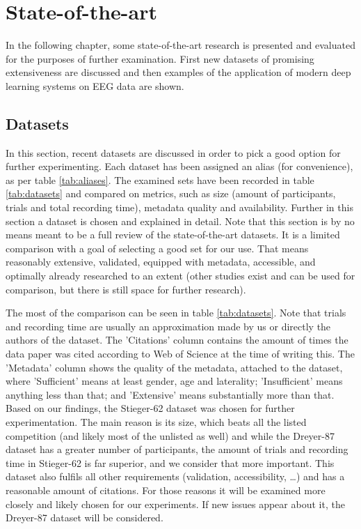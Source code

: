 \documentclass[english, he, bc, kiv, iso690alph, viewonly]{fasthesis}
\begin{document}
\chapter{State-of-the-art}

In the following chapter, some state-of-the-art research is presented and evaluated for the purposes of further examination. First new datasets of promising extensiveness are discussed and then examples of the application of modern deep learning systems on EEG data are shown.

\section{Datasets}

In this section, recent datasets are discussed in order to pick a good option for further experimenting. Each dataset has been assigned an alias (for convenience), as per table \ref{tab:aliases}. The examined sets have been recorded in table \ref{tab:datasets} and compared on metrics, such as size (amount of participants, trials and total recording time), metadata quality and availability. Further in this section a dataset is chosen and explained in detail. Note that this section is by no means meant to be a full review of the state-of-the-art datasets. It is a limited comparison with a goal of selecting a good set for our use. That means reasonably extensive, validated, equipped with metadata, accessible, and optimally already researched to an extent (other studies exist and can be used for comparison, but there is still space for further research).

The most of the comparison can be seen in table \ref{tab:datasets}. Note that trials and recording time are usually an approximation made by us or directly the authors of the dataset. The 'Citations' column contains the amount of times the data paper was cited according to Web of Science at the time of writing this. The 'Metadata' column shows the quality of the metadata, attached to the dataset, where 'Sufficient' means at least gender, age and laterality; 'Insufficient' means anything less than that; and 'Extensive' means substantially more than that.
Based on our findings, the Stieger-62 dataset was chosen for further experimentation. The main reason is its size, which beats all the listed competition (and likely most of the unlisted as well) and while the Dreyer-87 dataset has a greater number of participants, the amount of trials and recording time in Stieger-62 is far superior, and we consider that more important. This dataset also fulfils all other requirements (validation, accessibility, \dots) and has a reasonable amount of citations. For those reasons it will be examined more closely and likely chosen for our experiments. If new issues appear about it, the Dreyer-87 dataset will be considered.
\end{document}

